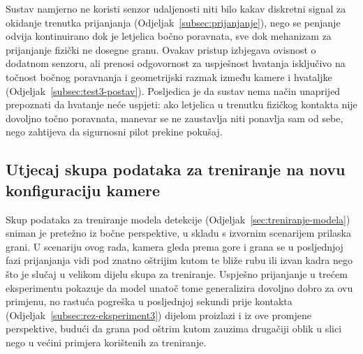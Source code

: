 Sustav namjerno ne koristi senzor udaljenosti niti bilo kakav diskretni signal za okidanje trenutka prijanjanja (Odjeljak~\ref{subsec:prijanjanje}), nego se penjanje odvija kontinuirano dok je letjelica bočno poravnata, sve dok mehanizam za prijanjanje fizički ne dosegne granu. Ovakav pristup izbjegava ovisnost o dodatnom senzoru, ali prenosi odgovornost za uspješnost hvatanja isključivo na točnost bočnog poravnanja i geometrijski razmak između kamere i hvataljke (Odjeljak~\ref{subsec:test3-postav}). Posljedica je da sustav nema način unaprijed prepoznati da hvatanje neće uspjeti: ako letjelica u trenutku fizičkog kontakta nije dovoljno točno poravnata, manevar se ne zaustavlja niti ponavlja sam od sebe, nego zahtijeva da sigurnosni pilot prekine pokušaj.

\subsection{Utjecaj skupa podataka za treniranje na novu konfiguraciju kamere}
\label{subsec:rasprava-dataset}

Skup podataka za treniranje modela detekcije (Odjeljak~\ref{sec:treniranje-modela}) sniman je pretežno iz bočne perspektive, u skladu s izvornim scenarijem prilaska grani. U scenariju ovog rada, kamera gleda prema gore i grana se u posljednjoj fazi prijanjanja vidi pod znatno oštrijim kutom te bliže rubu ili izvan kadra nego što je slučaj u velikom dijelu skupa za treniranje. Uspješno prijanjanje u trećem eksperimentu pokazuje da model unatoč tome generalizira dovoljno dobro za ovu primjenu, no rastuća pogreška u posljednjoj sekundi prije kontakta (Odjeljak~\ref{subsec:rez-eksperiment3}) dijelom proizlazi i iz ove promjene perspektive, budući da grana pod oštrim kutom zauzima drugačiji oblik u slici nego u većini primjera korištenih za treniranje.

